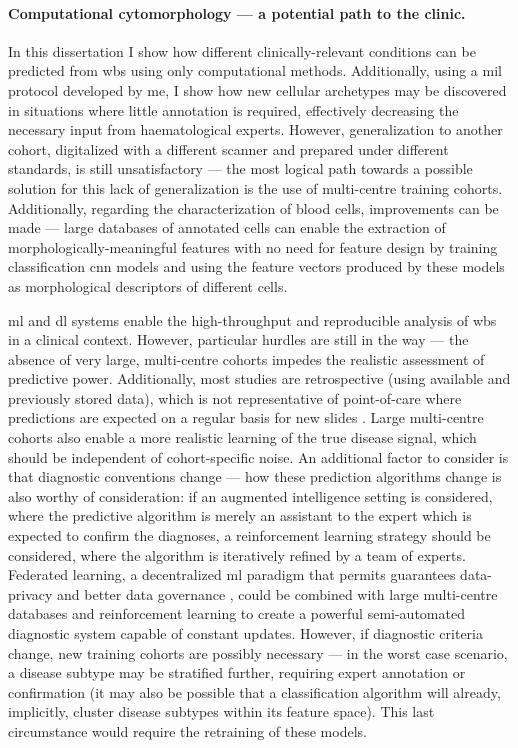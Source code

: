 \paragraph{Computational cytomorphology --- a potential path to the clinic.} In this dissertation I show how different clinically-relevant conditions can be predicted from \ac{wbs} using only computational methods. Additionally, using a \ac{mil} protocol developed by me, I show how new cellular archetypes may be discovered in situations where little annotation is required, effectively decreasing the necessary input from haematological experts. However, generalization to another cohort, digitalized with a different scanner and prepared under different standards, is still unsatisfactory --- the most logical path towards a possible solution for this lack of generalization is the use of multi-centre training cohorts. Additionally, regarding the characterization of blood cells, improvements can be made --- large databases of annotated cells can enable the extraction of morphologically-meaningful features with no need for feature design by training classification \ac{cnn} models and using the feature vectors produced by these models as morphological descriptors of different cells.

\Ac{ml} and \ac{dl} systems enable the high-throughput and reproducible analysis of \ac{wbs} in a clinical context. However, particular hurdles are still in the way --- the absence of very large, multi-centre cohorts impedes the realistic assessment of predictive power. Additionally, most studies are retrospective (using available and previously stored data), which is not representative of point-of-care where predictions are expected on a regular basis for new slides \cite{Eckardt2020-fp}. Large multi-centre cohorts also enable a more realistic learning of the true disease signal, which should be independent of cohort-specific noise. An additional factor to consider is that diagnostic conventions change --- how these prediction algorithms change is also worthy of consideration: if an augmented intelligence setting is considered, where the predictive algorithm is merely an assistant to the expert which is expected to confirm the diagnoses, a reinforcement learning strategy should be considered, where the algorithm is iteratively refined by a team of experts. Federated learning, a decentralized \ac{ml} paradigm that permits guarantees data-privacy and better data governance \cite{Rieke2020-hl}, could be combined with large multi-centre databases and reinforcement learning to create a powerful semi-automated diagnostic system capable of constant updates. However, if diagnostic criteria change, new training cohorts are possibly necessary --- in the worst case scenario, a disease subtype may be stratified further, requiring expert annotation or confirmation (it may also be possible that a classification algorithm will already, implicitly, cluster disease subtypes within its feature space). This last circumstance would require the retraining of these models.

